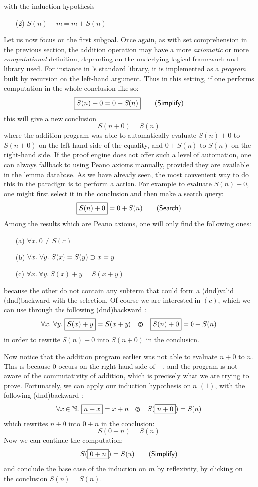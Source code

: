 with the induction hypothesis
\begin{itemize}
  \item[(2)] $S(n) + m = m + S(n)$
\end{itemize}
Let us now focus on the first subgoal. Once again, as with set comprehension in
the previous section, the addition operation may have a more \emph{axiomatic} or
more \emph{computational} definition, depending on the underlying logical
framework and library used. For instance in 's standard library, it is
implemented as a \emph{program} built by recursion on the left-hand argument.
Thus in this setting, if one performs computation in the whole conclusion like
so:
$$\fbox{$S(n) + 0 = 0 + S(n)$} \qquad \text{(\textsf{Simplify})}$$
this will give a new conclusion
$$S(n + 0) = S(n)$$
where the addition program was able to automatically evaluate $S(n) + 0$ to $S(n
+ 0)$ on the left-hand side of the equality, and $0 + S(n)$ to $S(n)$ on the
right-hand side. If the proof engine does not offer such a level of automation,
one can always fallback to using Peano axioms manually, provided they are
available in the lemma database. As we have already seen, the most convenient
way to do this in the  paradigm is to perform a 
action. For example to evaluate $S(n) + 0$, one might first select it in the
conclusion and then make a search query:
$$\fbox{$S(n) + 0$} = 0 + S(n) \qquad \text{(\textsf{Search})}$$
Among the results which are Peano axioms, one will only find the following
ones:
\begin{itemize}
  \item[(a)] $\forall x.\ 0 \not= S(x)$
  \item[(b)] $\forall x.\ \forall y.\ S(x) = S(y) \supset x = y$
  \item[(c)] $\forall x.\ \forall y.\ S(x) + y = S(x + y)$
\end{itemize}
because the other  do not contain any subterm that could form a
\kl(dnd){valid} \kl(dnd){backward}  with the selection. Of
course we are interested in  $(c)$, which we can use through the following
\kl(dnd){backward} :
$$\forall x.\ \forall y.\ \fbox{$S(x) + y$} = S(x + y) ~~\operatorname{\,\varogreaterthan\,}~~ \fbox{$S(n) + 0$} = 0 + S(n)$$
in order to rewrite $S(n) + 0$ into $S(n + 0)$ in the conclusion.

Now notice that the addition program earlier was not able to evaluate $n + 0$ to
$n$. This is because $0$ occurs on the right-hand side of $+$, and the program
is not aware of the commutativity of addition, which is precisely what we are
trying to prove. Fortunately, we can apply our induction hypothesis on $n$
$(1)$, with the following \kl(dnd){backward} :
$$\forall x \in \mathbb{N}.\ \fbox{$n + x$} = x + n ~~\operatorname{\,\varogreaterthan\,}~~ S(\fbox{$n + 0$}) = S(n)$$
which rewrites $n + 0$ into $0 + n$ in the conclusion:
$$S(0 + n) = S(n)$$
Now we can continue the computation:
$$S(\fbox{$0 + n$}) = S(n) \qquad \text{(\textsf{Simplify})}$$
and conclude the base case of the induction on $m$ by reflexivity, by clicking
on the conclusion $S(n) = S(n)$.

